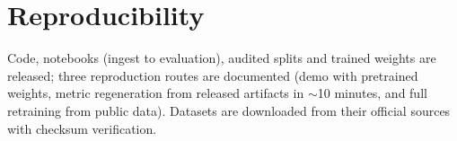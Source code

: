 \documentclass[conference]{IEEEtran}
\begin{document}
\section*{Reproducibility}
Code, notebooks (ingest to evaluation), audited splits and trained weights
are released; three reproduction routes are documented (demo
with pretrained weights, metric regeneration from released artifacts in
$\sim$10 minutes, and full retraining from public data). Datasets are downloaded
from their official sources with checksum verification.



\end{document}
